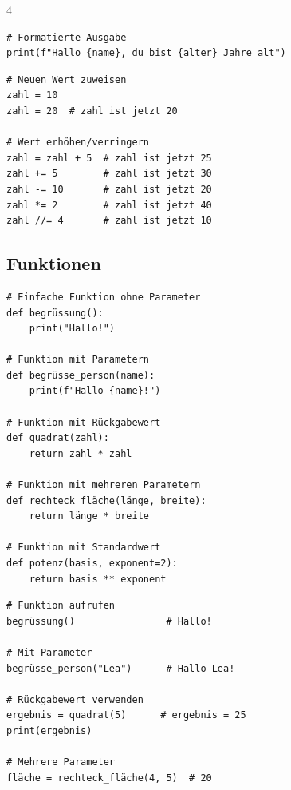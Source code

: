 \begin{landscape}
\begin{multicols*}{4}
\begin{cheatSheetBox}[title=Eingabe und Ausgabe]
\begin{lstlisting}
# Formatierte Ausgabe
print(f"Hallo {name}, du bist {alter} Jahre alt")
\end{lstlisting}
		\end{cheatSheetBox}

		\begin{cheatSheetBox}[title=Wert verändern]
			\begin{lstlisting}
# Neuen Wert zuweisen
zahl = 10
zahl = 20  # zahl ist jetzt 20

# Wert erhöhen/verringern
zahl = zahl + 5  # zahl ist jetzt 25
zahl += 5        # zahl ist jetzt 30
zahl -= 10       # zahl ist jetzt 20
zahl *= 2        # zahl ist jetzt 40
zahl //= 4       # zahl ist jetzt 10
\end{lstlisting}
		\end{cheatSheetBox}

		\columnbreak\textcolor{\cheatSheetColor}{\subsection*{Funktionen}}

		\begin{cheatSheetBox}[title=Funktionen definieren]
			\begin{lstlisting}
# Einfache Funktion ohne Parameter
def begrüssung():
    print("Hallo!")

# Funktion mit Parametern
def begrüsse_person(name):
    print(f"Hallo {name}!")

# Funktion mit Rückgabewert
def quadrat(zahl):
    return zahl * zahl

# Funktion mit mehreren Parametern
def rechteck_fläche(länge, breite):
    return länge * breite

# Funktion mit Standardwert
def potenz(basis, exponent=2):
    return basis ** exponent
\end{lstlisting}
		\end{cheatSheetBox}

		\begin{cheatSheetBox}[title=Funktionen aufrufen]
			\begin{lstlisting}
# Funktion aufrufen
begrüssung()                # Hallo!

# Mit Parameter
begrüsse_person("Lea")      # Hallo Lea!

# Rückgabewert verwenden
ergebnis = quadrat(5)      # ergebnis = 25
print(ergebnis)

# Mehrere Parameter
fläche = rechteck_fläche(4, 5)  # 20


\end{lstlisting}
\end{cheatSheetBox}
\end{multicols*}
\end{landscape}
